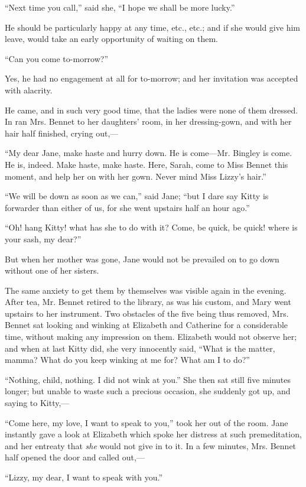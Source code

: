 \documentclass[12pt]{book}
\begin{document}
``Next time you call,'' said she, ``I hope we shall be more lucky.''

He should be particularly happy at any time, etc., etc.; and if she would give him leave, would take an early opportunity of waiting on them.

``Can you come to-morrow?''

Yes, he had no engagement at all for to-morrow; and her invitation was accepted with alacrity.

He came, and in such very good time, that the ladies were none of them dressed. In ran Mrs. Bennet to her daughters' room, in her dressing-gown, and with her hair half finished, crying out,---

``My dear Jane, make haste and hurry down. He is come---Mr. Bingley is come. He is, indeed. Make haste, make haste. Here, Sarah, come to Miss Bennet this moment, and help her on with her gown. Never mind Miss Lizzy's hair.''

``We will be down as soon as we can,'' said Jane; ``but I dare say Kitty is forwarder than either of us, for she went upstairs half an hour ago.''

``Oh! hang Kitty! what has she to do with it? Come, be quick, be quick! where is your sash, my dear?''

But when her mother was gone, Jane would not be prevailed on to go down without one of her sisters.

The same anxiety to get them by themselves was visible again in the evening. After tea, Mr. Bennet retired to the library, as was his custom, and Mary went upstairs to her instrument. Two obstacles of the five being thus removed, Mrs. Bennet sat looking and winking at Elizabeth and Catherine for a considerable time, without making any impression on them. Elizabeth would not observe her; and when at last Kitty did, she very innocently said, ``What is the matter, mamma? What do you keep winking at me for? What am I to do?''

``Nothing, child, nothing. I did not wink at you.'' She then sat still five minutes longer; but unable to waste such a precious occasion, she suddenly got up, and saying to Kitty,---

``Come here, my love, I want to speak to you,'' took her out of the room. Jane instantly gave a look at Elizabeth which spoke her distress at such premeditation, and her entreaty that \textit{she} would not give in to it. In a few minutes, Mrs. Bennet half opened the door and called out,---

``Lizzy, my dear, I want to speak with you.''
\end{document}
